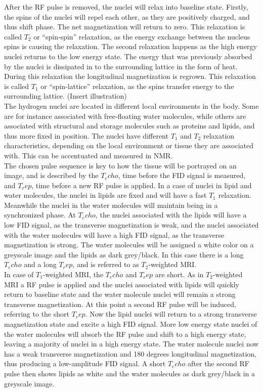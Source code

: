 After the RF pulse is removed, the nuclei will relax into baseline state. Firstly, the spins of the nuclei will repel each other, as they are positively charged, and thus shift phase. The net magnetization will return to zero. This relaxation is called $T_2$ or “spin-spin” relaxation, as the energy exchange between the nucleus spins is causing the relaxation. The second relaxation happens as the high energy nuclei returns to the low energy state. The energy that was previously absorbed by the nuclei is dissipated in to the surrounding lattice in the form of heat. During this relaxation the longitudinal magnetization is regrown. This relaxation is called $T_1$ or “spin-lattice” relaxation, as the spins transfer energy to the surrounding lattice.
{\Large (Insert illustration)} \\
The hydrogen nuclei are located in different local environments in the body. Some are for instance associated with free-floating water molecules, while others are associated with structural and storage molecules such as proteins and lipids, and thus more fixed in position. The nuclei have different $T_1$ and $T_2$ relaxation characteristics, depending on the local environment or tissue they are associated with. This can be accentuated and measured in NMR. \\
The chosen pulse sequence is key to how the tissue will be portrayed on an image, and is described by the $T_echo$, time before the FID signal is measured, and $T_rep$, time before a new RF pulse is applied. In a case of nuclei in lipid and water molecules, the nuclei in lipids are fixed and will have a fast $T_1$ relaxation. Meanwhile the nuclei in the water molecules will maintain being in a synchronized phase. At $T_echo$, the nuclei associated with the lipids will have a low FID signal, as the transverse magnetization is weak, and the nuclei associated with the water molecules will have a high FID signal, as the transverse magnetization is strong. The water molecules will be assigned a white color on a greyscale image and the lipids as dark grey/black. In this case there is a long $T_echo$ and a long $T_rep$, and is referred to as $T_2$-weighted MRI. \\
In case of $T_1$-weighted MRI, the $T_echo$ and $T_rep$ are short. As in $T_2$-weighted MRI a RF pulse is applied and the nuclei associated with lipids will quickly return to baseline state and the water molecule nuclei will remain a strong transverse magnetization. At this point a second RF pulse will be induced, referring to the short $T_rep$. Now the lipid nuclei will return to a strong transverse magnetization state and excite a high FID signal. More low energy state nuclei of the water molecules will absorb the RF pulse and shift to a high energy state, leaving a majority of nuclei in a high energy state. The water molecule nuclei now has a weak transverse magnetization and 180 degrees longitudinal magnetization, thus producing a low-amplitude FID signal. A short $T_echo$ after the second RF pulse then shows lipids as white and the water molecules as dark grey/black in a greyscale image. 

